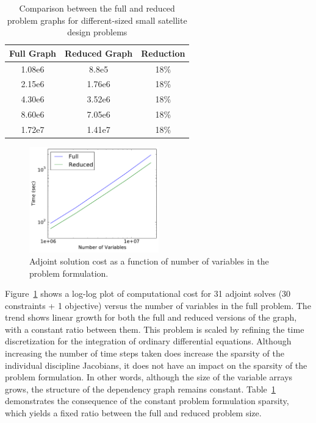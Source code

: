 \documentclass[]{aiaa-tc} %
\begin{document}
            \begin{table}
              \centering
              \caption{Comparison between the full and reduced problem graphs for different-sized small satellite design problems}
                \begin{tabular}{c c c}
                    \toprule
                    Full Graph & Reduced Graph & Reduction\\
                    \midrule
                    1.08e6 & 8.8e5 &  18\%\\
                    2.15e6 & 1.76e6 & 18\%\\
                    4.30e6 & 3.52e6 & 18\%\\
                    8.60e6 & 7.05e6 & 18\%\\
                    1.72e7 & 1.41e7 & 18\%\\
                    \bottomrule
                \end{tabular}
                \label{tab:cadre-problem-sizes}
            \end{table}


            \begin{figure}[!htbp]
                \centering
                \includegraphics[width=0.5\textwidth]{images/cadre_var_scaling}
                \caption{Adjoint solution cost as a function of number of variables in the problem formulation.}
                \label{fig:cadre-compute-cost}
            \end{figure}

            Figure~\ref{fig:cadre-compute-cost} shows a log-log plot of computational cost for 31 adjoint solves (30 constraints + 1 objective) versus the
            number of variables in the full problem. The trend shows linear growth for both the full and reduced
            versions of the graph, with a constant ratio between them. This problem is scaled by
            refining the time discretization for the integration of ordinary differential equations. Although
            increasing the number of time steps taken does increase the sparsity of the individual discipline Jacobians,
            it does not have an impact on the sparsity of the problem formulation. In other words, although the size of the
            variable arrays grows, the structure of the dependency graph remains constant. Table~\ref{tab:cadre-problem-sizes}
            demonstrates the consequence of the constant problem formulation sparsity, which yields a fixed ratio between
            the full and reduced problem size.
\end{document}
